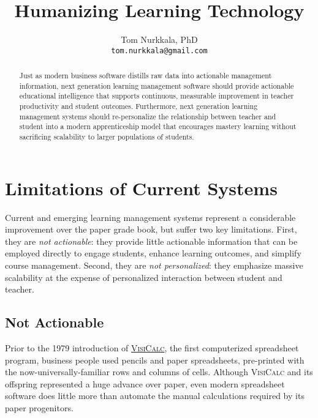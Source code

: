 \documentclass{article}
\title{Humanizing Learning Technology}
\author{Tom Nurkkala, PhD\\\texttt{tom.nurkkala@gmail.com}}
\newcommand{\vcalc}{\textsc{VisiCalc}}
\begin{document}
\maketitle

\begin{abstract}
  Just as modern business software
  distills raw data into actionable management information,
  next generation learning management software
  should provide actionable educational intelligence
  that supports continuous, measurable improvement
  in teacher productivity and student outcomes.
  Furthermore, next generation learning management systems
  should re-personalize the relationship between teacher and student
  into a modern apprenticeship model
  that encourages mastery learning
  without sacrificing scalability
  to larger populations of students.
\end{abstract}




\section{Limitations of Current Systems}
\label{sec:limitations}

Current and emerging learning management systems
represent a considerable improvement over the paper grade book,
but suffer two key limitations.
First,
they are \emph{not actionable}:
they provide little actionable information
that can be employed directly to engage students,
enhance learning outcomes,
and simplify course management.
Second,
they are \emph{not personalized}:
they emphasize massive scalability
at the expense of personalized interaction
between student and teacher.

\subsection{Not Actionable}
\label{sec:not-actionable}

Prior to the 1979 introduction
of \href{https://en.wikipedia.org/wiki/VisiCalc}{\vcalc{}},
the first computerized spreadsheet program,
business people used pencils and paper spreadsheets,
pre-printed with the now-universally-familiar rows and columns of cells.
Although \vcalc{} and its offspring
represented a huge advance over paper,
even modern spreadsheet software does little more
than automate the manual calculations
required by its paper progenitors.
\end{document}
